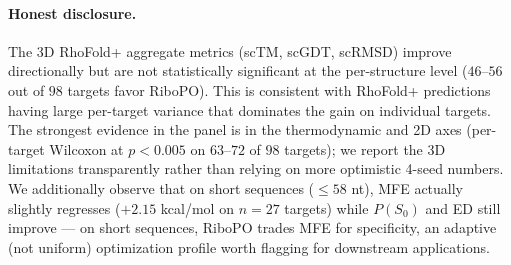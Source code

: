 \paragraph{Honest disclosure.}
The 3D RhoFold+ aggregate metrics (scTM, scGDT, scRMSD) improve directionally but are not statistically significant at the per-structure level ($46$--$56$ out of $98$ targets favor RiboPO). This is consistent with RhoFold+ predictions having large per-target variance that dominates the gain on individual targets. The strongest evidence in the panel is in the thermodynamic and 2D axes (per-target Wilcoxon at $p < 0.005$ on $63$--$72$ of $98$ targets); we report the 3D limitations transparently rather than relying on more optimistic 4-seed numbers. We additionally observe that on short sequences ($\leq 58$ nt), MFE actually slightly regresses ($+2.15$ kcal/mol on $n=27$ targets) while $P(S_0)$ and ED still improve --- on short sequences, RiboPO trades MFE for specificity, an adaptive (not uniform) optimization profile worth flagging for downstream applications.

